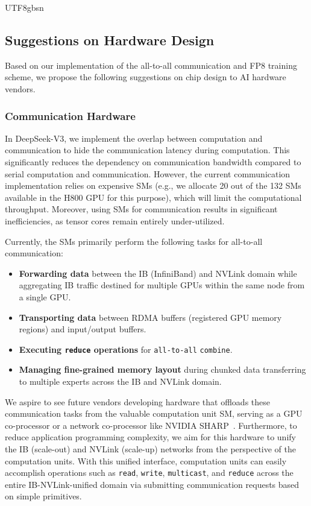 \documentclass[11pt, a4paper, logo, copyright, nonumbering]{deepseek}
\newcommand{\dsviii}{DeepSeek-V3}
\begin{document}
\begin{CJK*}{UTF8}{gbsn}
\subsection{Suggestions on Hardware Design}
\label{fp8_hardware_design}

Based on our implementation of the all-to-all communication and FP8 training scheme, we propose the following suggestions on chip design to AI hardware vendors.

\subsubsection{Communication Hardware}

In \dsviii{}, we implement the overlap between computation and communication to hide the communication latency during computation. 
This significantly reduces the dependency on communication bandwidth compared to serial computation and communication. 
However, the current communication implementation relies on expensive SMs (e.g., we allocate 20 out of the 132 SMs available in the H800 GPU for this purpose), which will limit the computational throughput.
Moreover, using SMs for communication results in significant inefficiencies, as tensor cores remain entirely under-utilized.

Currently, the SMs primarily perform the following tasks for all-to-all communication:
\begin{itemize}[topsep=0pt]
    \item 
    \textbf{Forwarding data} between the IB (InfiniBand) and NVLink domain while aggregating IB traffic destined for multiple GPUs within the same node from a single GPU.
    \item 
    \textbf{Transporting data} between RDMA buffers (registered GPU memory regions) and input/output buffers.
    \item 
    \textbf{Executing \texttt{reduce} operations} for \texttt{all-to-all} \texttt{combine}.
    \item
    \textbf{Managing fine-grained memory layout} during chunked data transferring to multiple experts across the IB and NVLink domain.
\end{itemize}

We aspire to see future vendors developing hardware that offloads these communication tasks from the valuable computation unit SM, serving as a GPU co-processor or a network co-processor like NVIDIA SHARP~\cite{nvsharp}. 
Furthermore, to reduce application programming complexity, we aim for this hardware to unify the IB (scale-out) and NVLink (scale-up) networks from the perspective of the computation units. 
With this unified interface, computation units can easily accomplish operations such as \texttt{read}, \texttt{write}, \texttt{multicast}, and \texttt{reduce} across the entire IB-NVLink-unified domain via submitting communication requests based on simple primitives.


\end{CJK*}
\end{document}
